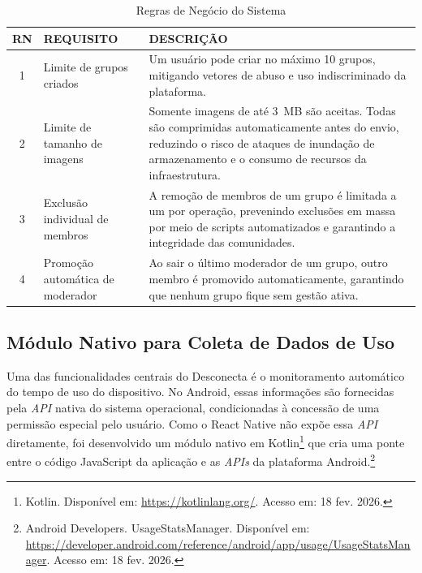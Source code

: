 \begin{table}[H]
\centering
\caption{Regras de Negócio do Sistema}
\label{tab:regras-negocio}
\begin{tabularx}{\textwidth}{|c|l|X|}
\hline
\rowcolor{verdeclaro}
\textbf{RN} & \textbf{REQUISITO} & \textbf{DESCRIÇÃO} \\ \hline

1 & Limite de grupos criados &
Um usuário pode criar no máximo 10 grupos, mitigando vetores de abuso e uso indiscriminado da plataforma. \\ \hline

2 & Limite de tamanho de imagens &
Somente imagens de até 3~MB são aceitas. Todas são comprimidas automaticamente antes do envio, reduzindo o risco de ataques de inundação de armazenamento e o consumo de recursos da infraestrutura.\\ \hline

3 & Exclusão individual de membros &
A remoção de membros de um grupo é limitada a um por operação, prevenindo exclusões em massa por meio de scripts automatizados e garantindo a integridade das comunidades.\\ \hline

4 & Promoção automática de moderador &
Ao sair o último moderador de um grupo, outro membro é promovido automaticamente, garantindo que nenhum grupo fique sem gestão ativa.\\ \hline

\end{tabularx}
\end{table}

\subsection{Módulo Nativo para Coleta de Dados de Uso}

Uma das funcionalidades centrais do Desconecta é o monitoramento automático do tempo de uso do dispositivo. No Android, essas informações são fornecidas pela \textit{API} nativa do sistema operacional, condicionadas à concessão de uma permissão especial pelo usuário. Como o React Native não expõe essa \textit{API} diretamente, foi desenvolvido um módulo nativo em Kotlin\footnote{Kotlin. Disponível em: \url{https://kotlinlang.org/}. Acesso em: 18 fev. 2026.} que cria uma ponte entre o código JavaScript da aplicação e as \textit{APIs} da plataforma Android.\footnote{Android Developers. UsageStatsManager. Disponível em: \url{https://developer.android.com/reference/android/app/usage/UsageStatsManager}. Acesso em: 18 fev. 2026.}

